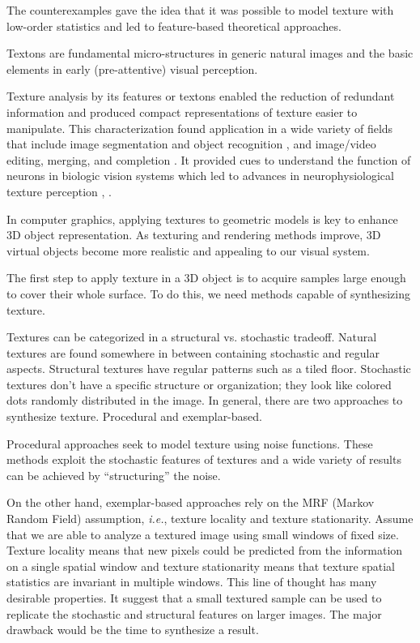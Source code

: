 The counterexamples gave the idea that it was possible to model texture with low-order statistics
and led to feature-based theoretical approaches.

\begin{definition}
 Textons are fundamental micro-structures in generic natural images and the basic elements in early (pre-attentive) visual perception.   
\end{definition}

Texture analysis by its features or textons
enabled the reduction of redundant information and produced compact 
representations of texture easier to manipulate.
This characterization found application in a wide variety of fields that include
image segmentation and object recognition \cite{leung2001representing},
and image/video editing, merging, and completion \cite{wexler2004space}.
It provided cues to understand the function of neurons in biologic vision systems
which led to advances in neurophysiological 
texture perception \cite{olshausen1997sparse}, \cite{landy2004visual}.

In computer graphics, applying textures to geometric models
is key to enhance 3D object representation. 
As texturing and rendering methods improve, 
3D virtual objects become more realistic 
and appealing to our visual system. 

The first step to apply texture in a 3D object is to acquire 
samples large enough to cover their whole surface.
To do this, we need methods capable of synthesizing texture. 

Textures can be categorized in a structural vs. stochastic tradeoff. 
Natural textures are found 
somewhere in between containing stochastic and regular aspects. 
Structural textures have regular patterns such as a tiled floor.
Stochastic textures don't have a specific structure or organization; they look 
like colored dots randomly distributed in the image. 
In general, there are two approaches to synthesize texture. Procedural 
and exemplar-based.

Procedural approaches seek to model texture using noise functions.
These methods exploit the stochastic features of textures and 
a wide variety of results can be achieved by ``structuring'' the noise.

On the other hand, exemplar-based approaches rely on the MRF (Markov Random Field)
assumption, \emph{i.e.}, texture locality and texture stationarity. 
Assume that we are able to analyze a textured image using small windows of fixed size. 
Texture locality means that new pixels could be predicted from 
the information on a single spatial window
and texture stationarity means that texture spatial statistics are invariant 
in multiple windows. 
This line of thought has many desirable properties. 
It suggest that a small textured sample can be used to 
replicate the stochastic and structural features on larger images. 
The major drawback would be the time to synthesize a result.

